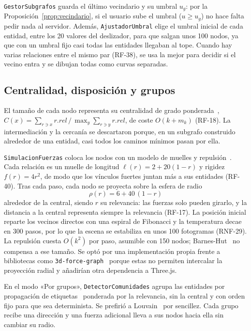 \texttt{GestorSubgrafos} guarda el último vecindario y su umbral $u_g$: por la Proposición~\ref{prop:vecindario}, si el usuario sube el umbral ($u \ge u_g$) no hace falta pedir nada al servidor. Además, \texttt{AjustadorUmbral} elige el umbral inicial de cada entidad, entre los 20 valores del deslizador, para que salgan unos 100 nodos, ya que con un umbral fijo casi todas las entidades llegaban al tope. Cuando hay varias relaciones entre el mismo par (RF-38), se usa la mejor para decidir si el vecino entra y se dibujan todas como curvas separadas.

\subsection{Centralidad, disposición y grupos}
\label{sec:alg-fuerzas}

El tamaño de cada nodo representa su centralidad de grado ponderada~\cite{freeman1978}, $C(x)=\sum_{r\ni x} r.rel \,/\, \max_y \sum_{r\ni y} r.rel$, de coste $O(k+m_k)$ (RF-18). La intermediación y la cercanía se descartaron porque, en un subgrafo construido alrededor de una entidad, casi todos los caminos mínimos pasan por ella.

\texttt{SimulacionFuerzas} coloca los nodos con un modelo de muelles y repulsión~\cite{fruchterman1991}. Cada relación es un muelle de longitud $\ell(r)=2+20(1-r)$ y rigidez $f(r)=4r^2$, de modo que los vínculos fuertes juntan más a sus entidades (RF-40). Tras cada paso, cada nodo se proyecta sobre la esfera de radio
\begin{equation}
  \rho(r) = 6 + 40\,(1-r)
\end{equation}
alrededor de la central, siendo $r$ su relevancia: las fuerzas solo pueden girarlo, y la distancia a la central representa siempre la relevancia (RF-17). La posición inicial reparte los vecinos directos con una espiral de Fibonacci y la temperatura decae en 300 pasos, por lo que la escena se estabiliza en unos 100 fotogramas (RNF-29). La repulsión cuesta $O(k^2)$ por paso, asumible con 150 nodos; Barnes-Hut~\cite{barneshut1986} no compensa a ese tamaño. Se optó por una implementación propia frente a bibliotecas como \texttt{3d-force-graph}~\cite{asturiano3dforcegraph} porque estas no permiten intercalar la proyección radial y añadirían otra dependencia a Three.js. 

En el modo «Por grupos», \texttt{DetectorComunidades} agrupa las entidades por propagación de etiquetas~\cite{raghavan2007} ponderada por la relevancia, sin la central y con orden fijo para que sea determinista. Se prefirió a Louvain~\cite{blondel2008} por sencillez. Cada grupo recibe una dirección y una fuerza adicional lleva a sus nodos hacia ella sin cambiar su radio.

